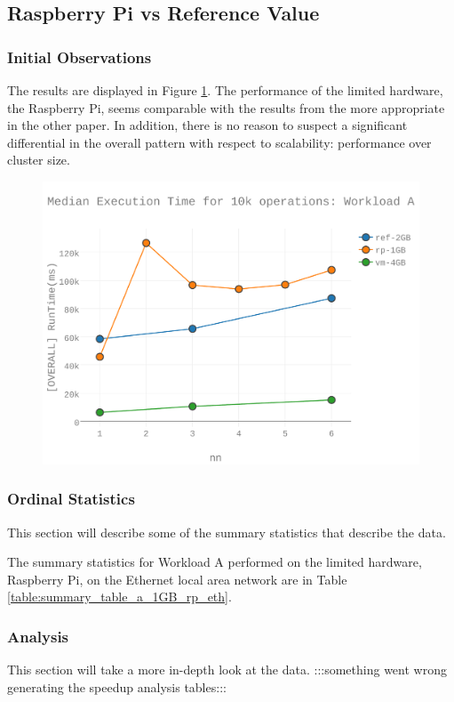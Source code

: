 \subsection{Raspberry Pi vs Reference Value}
\subsubsection{Initial Observations}
The results are displayed in Figure \ref{figures-wla_fig6}.  The performance of the limited hardware, the Raspberry Pi, seems comparable with the results from the more appropriate in the other paper.  In addition, there is no reason to suspect a significant differential in the overall pattern with respect to scalability: performance over cluster size. \begin{figure}[h]
\includegraphics[width=5.5in]{Figures/figures-wla_fig6.pdf}
\caption{}
\label{figures-wla_fig6}
\end{figure}



\subsubsection{Ordinal Statistics}
This section will describe some of the summary statistics that describe the data.  

The summary statistics for Workload A performed on the limited hardware, Raspberry Pi, on the Ethernet local area network are in Table \ref{table:summary_table_a_1GB_rp_eth}.



\subsubsection{Analysis}
This section will take a more in-depth look at the data.
:::something went wrong generating the speedup analysis tables:::

